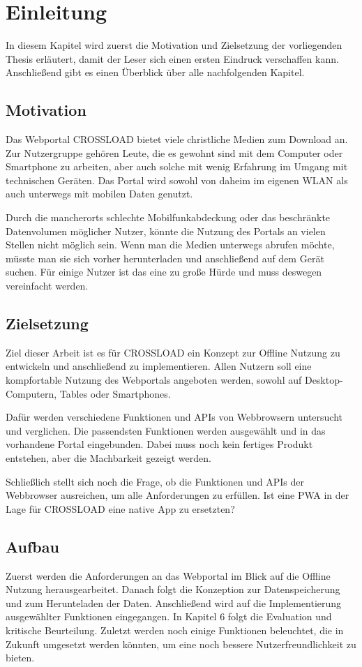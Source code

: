 \chapter{Einleitung}
\label{Kap1}

In diesem Kapitel wird zuerst die Motivation und Zielsetzung der vorliegenden Thesis erläutert, damit der Leser sich einen ersten Eindruck verschaffen kann. Anschließend gibt es einen Überblick über alle nachfolgenden Kapitel.


\section{Motivation}
Das Webportal CROSSLOAD bietet viele christliche Medien zum Download an. Zur Nutzergruppe gehören Leute, die es gewohnt sind mit dem Computer oder Smartphone zu arbeiten, aber auch solche mit wenig Erfahrung im Umgang mit technischen Geräten. Das Portal wird sowohl von daheim im eigenen WLAN als auch unterwegs mit mobilen Daten genutzt.

Durch die mancherorts schlechte Mobilfunkabdeckung oder das beschränkte
Datenvolumen möglicher Nutzer, könnte die Nutzung des Portals an vielen Stellen nicht
möglich sein. Wenn man die Medien unterwegs abrufen möchte, müsste man sie sich
vorher herunterladen und anschließend auf dem Gerät suchen. Für einige Nutzer ist das
eine zu große Hürde und muss deswegen vereinfacht werden. 

\section{Zielsetzung}
Ziel dieser Arbeit ist es für CROSSLOAD ein Konzept zur Offline Nutzung zu entwickeln und anschließend zu implementieren. Allen Nutzern soll eine kompfortable Nutzung des Webportals angeboten werden, sowohl auf Desktop-Computern, Tables oder Smartphones. 

Dafür werden verschiedene Funktionen und \acp{API} von Webbrowsern untersucht und verglichen. Die passendsten Funktionen werden ausgewählt und in das vorhandene Portal eingebunden. Dabei muss noch kein fertiges Produkt entstehen, aber die Machbarkeit gezeigt werden. 

Schließlich stellt sich noch die Frage, ob die Funktionen und APIs der Webbrowser ausreichen, um alle Anforderungen zu erfüllen. Ist eine \ac{PWA} in der Lage für CROSSLOAD eine native App zu ersetzten?

\section{Aufbau}
Zuerst werden die Anforderungen an das Webportal im Blick auf die Offline Nutzung herausgearbeitet. Danach folgt die Konzeption zur Datenspeicherung und zum Herunteladen der Daten. Anschließend wird auf die Implementierung ausgewählter Funktionen eingegangen. In Kapitel 6 folgt die Evaluation und kritische Beurteilung. Zuletzt werden noch einige Funktionen beleuchtet, die in Zukunft umgesetzt werden könnten, um eine noch bessere Nutzerfreundlichkeit zu bieten.
